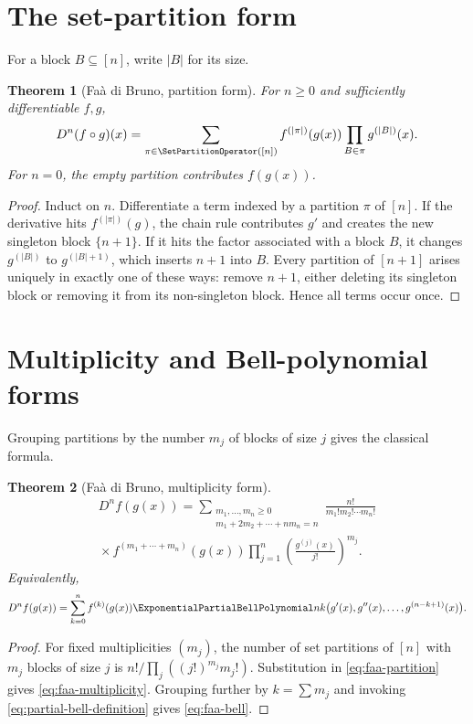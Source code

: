 \documentclass[11pt,a4paper,oneside,openany]{book}
\newtheorem{theorem}{Theorem}[chapter]
\theoremstyle{definition}
\theoremstyle{remark}
\begin{document}
\section{The set-partition form}
For a block $B\subseteq[n]$, write $|B|$ for its size.
\begin{theorem}[Fa\`a di Bruno, partition form]\label{thm:faa-partition}
For $n\ge0$ and sufficiently differentiable $f,g$,
\begin{equation}\label{eq:faa-partition}
 D^n(f\circ g)(x)=
 \sum_{\pi\in\SetPartitionOperator([n])}
 f^{(|\pi|)}(g(x))\prod_{B\in\pi}g^{(|B|)}(x).
\end{equation}
For $n=0$, the empty partition contributes $f(g(x))$.
\end{theorem}
\begin{proof}
Induct on $n$.  Differentiate a term indexed by a partition $\pi$ of $[n]$.
If the derivative hits $f^{(|\pi|)}(g)$, the chain rule contributes $g'$ and
creates the new singleton block $\{n+1\}$.  If it hits the factor associated with
a block $B$, it changes $g^{(|B|)}$ to $g^{(|B|+1)}$, which inserts $n+1$ into
$B$.  Every partition of $[n+1]$ arises uniquely in exactly one of these ways:
remove $n+1$, either deleting its singleton block or removing it from its
non-singleton block.  Hence all terms occur once.
\end{proof}

\section{Multiplicity and Bell-polynomial forms}
Grouping partitions by the number $m_j$ of blocks of size $j$ gives the classical
formula.
\begin{theorem}[Fa\`a di Bruno, multiplicity form]\label{thm:faa-multiplicity}
\begin{multline}\label{eq:faa-multiplicity}
 D^n f(g(x))=
 \sum_{\substack{m_1,\ldots,m_n\ge0\\
                  m_1+2m_2+\cdots+nm_n=n}}
 \frac{n!}{m_1!m_2!\cdots m_n!}\\
 {}\times f^{(m_1+\cdots+m_n)}(g(x))
 \prod_{j=1}^{n}\left(\frac{g^{(j)}(x)}{j!}\right)^{m_j}.
\end{multline}
Equivalently,
\begin{equation}\label{eq:faa-bell}
 D^n f(g(x))=
 \sum_{k=0}^{n}f^{(k)}(g(x))
 \ExponentialPartialBellPolynomial nk\bigl(g'(x),g''(x),\ldots,g^{(n-k+1)}(x)\bigr).
\end{equation}
\end{theorem}
\begin{proof}
For fixed multiplicities $(m_j)$, the number of set partitions of $[n]$ with
$m_j$ blocks of size $j$ is
$n!/\prod_j((j!)^{m_j}m_j!)$.  Substitution in
\eqref{eq:faa-partition} gives \eqref{eq:faa-multiplicity}.  Grouping further by
$k=\sum m_j$ and invoking \eqref{eq:partial-bell-definition} gives
\eqref{eq:faa-bell}.
\end{proof}
\end{document}
